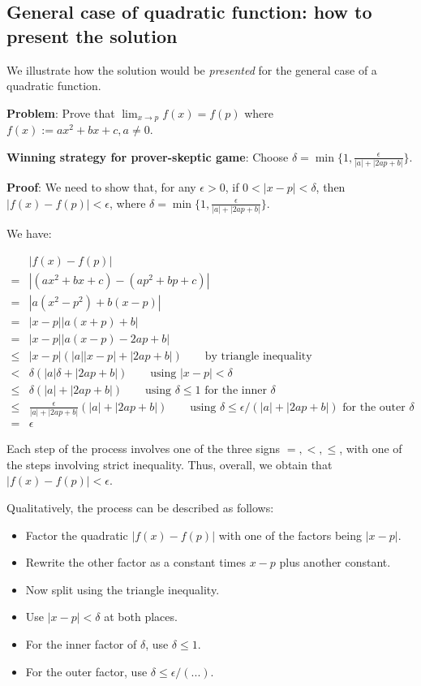 \documentclass[10pt]{amsart}
\begin{document}
\subsection{General case of quadratic function: how to present the solution}

We illustrate how the solution would be {\em presented} for the
general case of a quadratic function.

{\bf Problem}: Prove that $\lim_{x \to p} f(x) = f(p)$ where $f(x) :=
ax^2 + bx + c, a \ne 0$.

{\bf Winning strategy for prover-skeptic game}: Choose $\delta = \min
\{ 1, \frac{\epsilon}{|a| + |2ap + b|} \}$.

{\bf Proof}: We need to show that, for any $\epsilon > 0$, if $0 < |x -
p| < \delta$, then $|f(x) - f(p)| < \epsilon$, where $\delta = \min \{
1, \frac{\epsilon}{|a| + |2ap + b|} \}$.

We have:

\begin{align*}
  & |f(x) - f(p)| \\
= & |(ax^2 + bx + c) - (ap^2 + bp + c)| \\
= & |a(x^2 - p^2) + b(x - p)| \\
= & |x - p||a(x + p) + b| \\
= & |x - p||a(x - p) - 2ap + b|\\
\le & |x - p|(|a||x - p| + |2ap + b|) \qquad \text{by triangle inequality} \\
< & \delta(|a|\delta + |2ap + b|) \qquad \text{using $|x - p| < \delta$}\\
\le & \delta(|a| + |2ap + b|) \qquad \text{using $\delta \le 1$ for the inner $\delta$} \\
\le & \frac{\epsilon}{|a| + |2ap + b|}(|a| + |2ap + b|) \qquad \text{using $\delta \le \epsilon/(|a| + |2ap + b|)$ for the outer $\delta$} \\
= & \epsilon
\end{align*}

Each step of the process involves one of the three signs $=, <, \le$,
with one of the steps involving strict inequality. Thus, overall, we
obtain that $|f(x) - f(p)| < \epsilon$.

Qualitatively, the process can be described as follows:

\begin{itemize}
\item Factor the quadratic $|f(x) - f(p)|$ with one of the factors
  being $|x - p|$.
\item Rewrite the other factor as a constant times $x - p$ plus another constant.
\item Now split using the triangle inequality.
\item Use $|x - p| < \delta$ at both places.
\item For the inner factor of $\delta$, use $\delta \le 1$.
\item For the outer factor, use $\delta \le \epsilon/(...)$.
\end{itemize}
\end{document}
